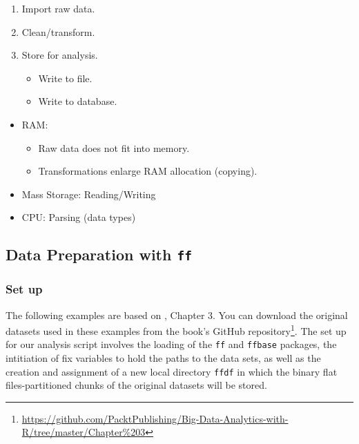 \documentclass[
  12pt,
]{style/krantz}
\providecommand{\tightlist}{%
  \setlength{\itemsep}{0pt}\setlength{\parskip}{0pt}}
\renewcommand{\href}[2]{#2\footnote{\url{#1}}}
\begin{document}
\begin{enumerate}
\def\labelenumi{\arabic{enumi}.}
\tightlist
\item
  Import raw data.
\item
  Clean/transform.
\item
  Store for analysis.

  \begin{itemize}
  \tightlist
  \item
    Write to file.
  \item
    Write to database.
  \end{itemize}
\end{enumerate}

\begin{itemize}
\tightlist
\item
  RAM:

  \begin{itemize}
  \tightlist
  \item
    Raw data does not fit into memory.
  \item
    Transformations enlarge RAM allocation (copying).
  \end{itemize}
\item
  Mass Storage: Reading/Writing
\item
  CPU: Parsing (data types)
\end{itemize}

\hypertarget{data-preparation-with-ff}{%
\subsection{\texorpdfstring{Data Preparation with \texttt{ff}}{Data Preparation with ff}}\label{data-preparation-with-ff}}

\hypertarget{set-up}{%
\subsubsection{Set up}\label{set-up}}

The following examples are based on \citet{walkowiak_2016}, Chapter 3. You can download the original datasets used in these examples from \href{https://github.com/PacktPublishing/Big-Data-Analytics-with-R/tree/master/Chapter\%203}{the book's GitHub repository}. The set up for our analysis script involves the loading of the \texttt{ff} and \texttt{ffbase} packages, the intitiation of fix variables to hold the paths to the data sets, as well as the creation and assignment of a new local directory \texttt{ffdf} in which the binary flat files-partitioned chunks of the original datasets will be stored.
\end{document}
